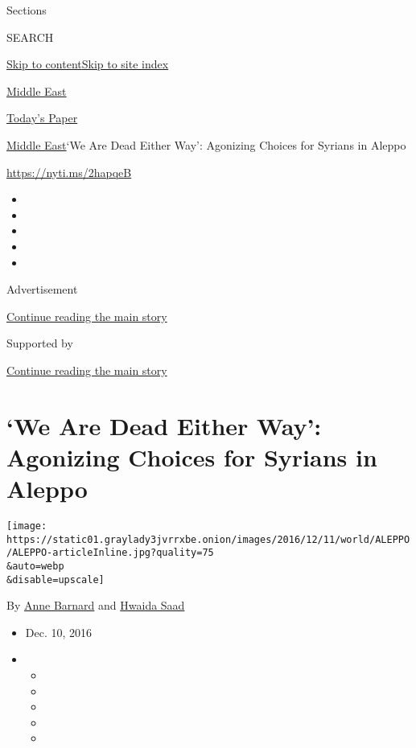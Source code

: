 Sections

SEARCH

\protect\hyperlink{site-content}{Skip to
content}\protect\hyperlink{site-index}{Skip to site index}

\href{https://www.nytimes3xbfgragh.onion/section/world/middleeast}{Middle
East}

\href{https://myaccount.nytimes3xbfgragh.onion/auth/login?response_type=cookie\&client_id=vi}{}

\href{https://www.nytimes3xbfgragh.onion/section/todayspaper}{Today's
Paper}

\href{/section/world/middleeast}{Middle East}\textbar{}`We Are Dead
Either Way': Agonizing Choices for Syrians in Aleppo

\url{https://nyti.ms/2hapqeB}

\begin{itemize}
\item
\item
\item
\item
\item
\end{itemize}

Advertisement

\protect\hyperlink{after-top}{Continue reading the main story}

Supported by

\protect\hyperlink{after-sponsor}{Continue reading the main story}

\hypertarget{we-are-dead-either-way-agonizing-choices-for-syrians-in-aleppo}{%
\section{`We Are Dead Either Way': Agonizing Choices for Syrians in
Aleppo}\label{we-are-dead-either-way-agonizing-choices-for-syrians-in-aleppo}}

\texttt{[image: https://static01.graylady3jvrrxbe.onion/images/2016/12/11/world/ALEPPO/ALEPPO-articleInline.jpg?quality=75\\\&auto=webp\\\&disable=upscale]}

By \href{http://www.nytimes3xbfgragh.onion/by/anne-barnard}{Anne
Barnard} and
\href{https://www.nytimes3xbfgragh.onion/by/hwaida-saad}{Hwaida Saad}

\begin{itemize}
\item
  Dec. 10, 2016
\item
  \begin{itemize}
  \item
  \item
  \item
  \item
  \item
  \end{itemize}
\end{itemize}

